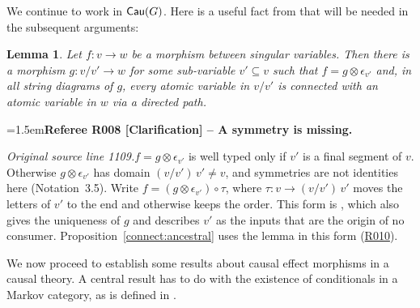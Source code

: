 \documentclass[12pt]{amsart}
\newcommand{\RefereeRemark}[4]{%
  \par\medskip\begingroup\normalfont\small\color{RefereePurple}%
  \emergencystretch=1.5em\noindent\textbf{Referee R#1 [#2] -- #3.}\par\nobreak\noindent #4\par
  \endgroup\medskip
}
\theoremstyle{plain}
\newtheorem{lem}[thm]{Lemma}
\theoremstyle{definition}
\theoremstyle{remark}
\numberwithin{equation}{section}
\theoremstyle{plain}
\newcommand{\0}{\emptyset}
\newcommand{\fun}{\longrightarrow}
\newcommand{\sub}{\subseteq}
\DeclareMathOperator{\cau}{\sf{Cau}}
\begin{document}
We continue to work in $\cau(G)$. Here is a useful fact from  \cite{YinZhangModularity} that will be  needed in the subsequent arguments:

\begin{lem}\label{infe:ances}
Let $f : v \fun w$ be a morphism between singular variables. Then there is a morphism $g : v / v' \fun w$ for some sub-variable $v' \sub v$ such that $f = g \otimes \epsilon_{v'}$ and, in all string diagrams of $g$, every atomic variable in $v / v'$ is connected with an atomic variable in $w$ via a directed path.
\end{lem}
\hypertarget{review-008}{}\RefereeRemark{008}{Clarification}{A symmetry is missing}{%
\textit{Original source line 1109.}\quad $f = g \otimes \epsilon_{v'}$ is well typed only if $v'$ is a final segment of $v$. Otherwise $g \otimes \epsilon_{v'}$ has domain $(v/v')\,v' \neq v$, and symmetries are not identities here (Notation~3.5). Write $f = (g \otimes \epsilon_{v'}) \circ \tau$, where $\tau : v \fun (v/v')\,v'$ moves the letters of $v'$ to the end and otherwise keeps the order. This form is \cite[Lemma~4.5]{YinZhangModularity}, which also gives the uniqueness of $g$ and describes $v'$ as the inputs that are the origin of no consumer. Proposition~\ref{connect:ancestral} uses the lemma in this form (\hyperlink{review-010}{R010}).
}


We now proceed to establish some results about causal effect morphisms in a causal theory. A central result has to do with the existence of conditionals in a Markov category, as is defined in \cite{fritz2020synthetic}.
\end{document}

